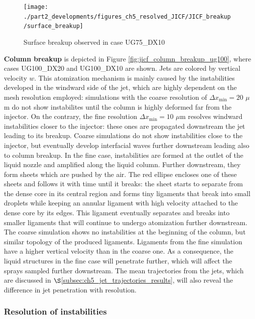 \clearpage

\begin{figure}[ht]
\centering
\texttt{[image: ./part2\_developments/figures\_ch5\_resolved\_JICF/JICF\_breakup/surface\_breakup]}
\caption{Surface breakup observed in case UG75\_DX10}
\label{fig:jicf_surface_breakup_ug75_dx10}
\end{figure}

\textbf{Column breakup} is depicted in Figure \ref{fig:jicf_column_breakup_ug100}, where cases UG100\_DX20 and UG100\_DX10 are shown. Jets are colored by vertical velocity $w$. This atomization mechanism is mainly caused by the instabilities developed in the windward side of the jet, which are highly dependent on the mesh resolution employed: simulations with the coarse resolution of $\Delta x_\mathrm{min} = 20$ $\mu$m do not show instabilites until the column is highly deformed far from the injector. On the contrary, the fine resolution $\Delta x_\mathrm{min} = 10$ $\mu$m resolves windward instabilities closer to the injector: these ones are propagated downstream the jet leading to its breakup. Coarse simulations do not show instabilities close to the injector, but eventually develop interfacial waves further downstream leading also to column breakup. In the fine case, instabilities are formed at the outlet of the liquid nozzle and amplified along the liquid column. Further downstream, they form sheets which are pushed by the air. The red ellipse encloses one of these sheets and follows it with time until it breaks: the sheet starts to separate from the dense core in its central region and forms tiny ligaments that break into small droplets while keeping an annular ligament with high velocity attached to the dense core by its edges. This ligament eventually separates and breaks into smaller ligaments that will continue to undergo atomization further downstream. The coarse simulation shows no instabilities at the beginning of the column, but similar topology of the produced ligaments. Ligaments from the fine simulation have a higher vertical velocity than in the coarse one. As a consequence, the liquid structures in the fine case will penetrate further, which will affect the sprays sampled further downstream. The mean trajectories from the jets, which are discussed in $\S$\ref{subsec:ch5_jet_trajectories_results}, will also reveal the difference in jet penetration with resolution. 

\subsubsection*{Resolution of instabilities}

